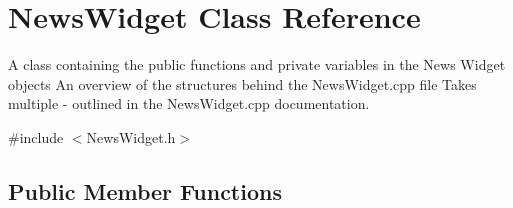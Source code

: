 \hypertarget{class_news_widget}{}\section{News\+Widget Class Reference}
\label{class_news_widget}


A class containing the public functions and private variables in the News Widget objects  An overview of the structures behind the News\+Widget.\+cpp file  Takes multiple -\/ outlined in the News\+Widget.\+cpp documentation.  




{\ttfamily \#include $<$News\+Widget.\+h$>$}

\subsection*{Public Member Functions}
